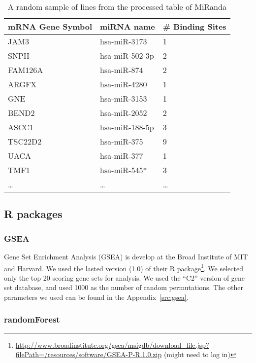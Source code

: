 \documentclass{scrartcl}
\numberwithin{figure}{section}
\numberwithin{table}{section}
\begin{document}
\begin{table}[h!]
\centering
\caption{A random sample of lines from the processed table of MiRanda}
\label{tab:mir}
\begin{tabular}{lll}
\toprule
  mRNA Gene Symbol & miRNA name     & \# Binding Sites \\
\midrule
  JAM3             & hsa-miR-3173   & 1 \\
  SNPH             & hsa-miR-502-3p & 2 \\
  FAM126A          & hsa-miR-874    & 2 \\
  ARGFX            & hsa-miR-4280   & 1 \\
  GNE              & hsa-miR-3153   & 1 \\
  BEND2            & hsa-miR-2052   & 2 \\
  ASCC1            & hsa-miR-188-5p & 3 \\
  TSC22D2          & hsa-miR-375    & 9 \\
  UACA             & hsa-miR-377    & 1 \\
  TMF1             & hsa-miR-545*   & 3 \\
  \ldots           & \ldots         & \ldots \\
\bottomrule
\end{tabular}
\end{table}

\subsection{R packages}


\subsubsection{GSEA}

Gene Set Enrichment Analysis (GSEA) is develop at the Broad Institute of MIT
and Harvard.  We used the lasted version (1.0) of their R
package\footnote{\url{http://www.broadinstitute.org/gsea/msigdb/download\_file.jsp?filePath=/resources/software/GSEA-P-R.1.0.zip}
(might need to log in)}. We selected only the top 20 scoring gene sets for
analysis. We used the ``C2'' version of gene set database, and used 1000 as the
number of random permutations. The other parameters we used can be found in the
Appendix~\ref{src:gsea}.

\subsubsection{randomForest}
\end{document}
